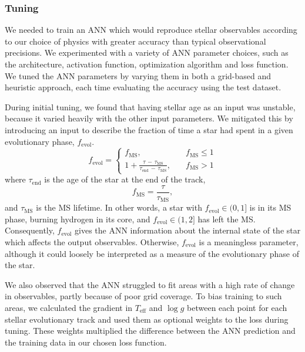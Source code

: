 \documentclass[a4paper,fleqn,usenatbib]{mnras}
\newcommand{\teff}{\ensuremath{T_\mathrm{eff}}}
\begin{document}
\subsubsection{Tuning}\label{sec:opt}

We needed to train an ANN which would reproduce stellar observables according to our choice of physics with greater accuracy than typical observational precisions. We experimented with a variety of ANN parameter choices, such as the architecture, activation function, optimization algorithm and loss function. We tuned the ANN parameters by varying them in both a grid-based and heuristic approach, each time evaluating the accuracy using the test dataset.

During initial tuning, we found that having stellar age as an input was unstable, because it varied heavily with the other input parameters. We mitigated this by introducing an input to describe the fraction of time a star had spent in a given evolutionary phase, $f_\mathrm{evol}$. 
%
\begin{equation}
    f_\mathrm{evol} = \begin{cases}
        f_\mathrm{MS},\quad &f_\mathrm{MS} \leq 1\\
        1 + \frac{\tau\,-\,\tau_\mathrm{MS}}{\tau_\mathrm{end}\,-\,\tau_\mathrm{MS}},\quad &f_\mathrm{MS} > 1
    \end{cases}
\end{equation}
%
where $\tau_\mathrm{end}$ is the age of the star at the end of the track,
%
\begin{equation}
    f_\mathrm{MS} = \frac{\tau}{\tau_\mathrm{MS}},
\end{equation}
%
and $\tau_\mathrm{MS}$ is the MS lifetime. In other words, a star with $f_\mathrm{evol} \in (0, 1]$ is in its MS phase, burning hydrogen in its core, and $f_\mathrm{evol} \in (1, 2]$ has left the MS. Consequently, $f_\mathrm{evol}$ gives the ANN information about the internal state of the star which affects the output observables. Otherwise, $f_\mathrm{evol}$ is a meaningless parameter, although it could loosely be interpreted as a measure of the evolutionary phase of the star.

We also observed that the ANN struggled to fit areas with a high rate of change in observables, partly because of poor grid coverage. To bias training to such areas, we calculated the gradient in $\teff$ and $\log g$ between each point for each stellar evolutionary track and used them as optional weights to the loss during tuning. These weights multiplied the difference between the ANN prediction and the training data in our chosen loss function.
\end{document}
